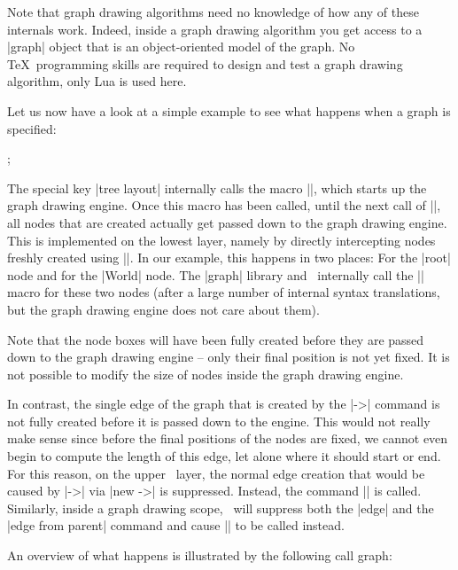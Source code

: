 Note that graph drawing algorithms need no knowledge of how any of
these internals work. Indeed, inside a graph drawing algorithm you get
access to a |graph| object that is an object-oriented model of the
graph. No \TeX\ programming skills are required to design and test a
graph drawing algorithm, only Lua is used here.

Let us now have a look at a simple example to see what happens when a
graph is specified:

\begin{codeexample}[]
  ;
\end{codeexample}

The special key |tree layout| internally calls the macro |\pgfgdbeginscope|,
which starts up the graph drawing engine. Once this macro has been
called, until the next call of |\pgfgdendscope|, all nodes that are
created actually get passed down to the graph drawing engine. This is
implemented on the lowest layer, namely by directly intercepting
nodes freshly created using |\pgfnode|. In our example, this happens
in two places: For the |root| node and for the |World| node. The
|graph| library and \tikzname\ internally call the |\pgfnode| macro
for these two nodes (after a large number of internal syntax
translations, but the graph drawing engine does not care about them).

Note that the node boxes will have been fully created before they are
passed down to the graph drawing engine -- only their final position
is not yet fixed. It is not possible to modify the size of nodes
inside the graph drawing engine. 

In contrast, the single edge of the graph that is created by the |->|
command is not fully created before it is passed down to the
engine. This would not really make sense since before the final
positions of the nodes are fixed, we cannot even begin to compute the
length of this edge, let alone where it should start or end. For this
reason, on the upper \tikzname\ layer, the normal edge creation that
would be caused by |->| via |new ->| is suppressed. Instead, the
command |\pgfgdedge| is called. Similarly, inside a graph drawing
scope, \tikzname\ will suppress both the |edge| and the
|edge from parent| command and cause |\pgfgdedge| to be called
instead. 

An overview of what happens is illustrated by the following call graph:

